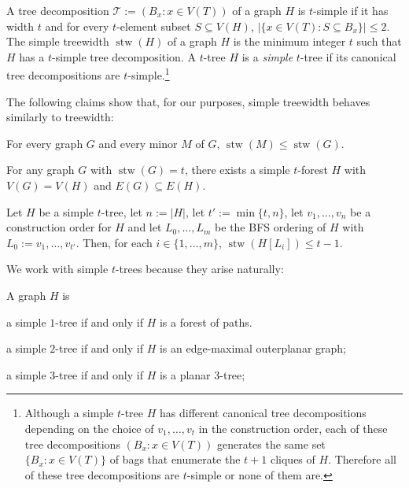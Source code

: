 \documentclass[kpfonts]{patmorin}
\DeclareMathOperator{\stw}{stw}
\theoremstyle{named}
\begin{document}
A tree decomposition $\mathcal{T}:=(B_x:x\in V(T))$ of a graph $H$ is $t$-simple if it has width $t$ and for every $t$-element subset $S\subseteq V(H)$, $|\{x\in V(T):S\subseteq B_x\}|\le 2$.  The simple treewidth $\stw(H)$ of a graph $H$ is the minimum integer $t$ such that $H$ has a $t$-simple tree decomposition.  A $t$-tree $H$ is a \emph{simple} $t$-tree if its canonical tree decompositions are $t$-simple.\footnote{Although a simple $t$-tree $H$ has different canonical tree decompositions depending on the choice of $v_1,\ldots,v_t$ in the construction order, each of these tree decompositions $(B_x:x\in V(T))$ generates the same set $\{B_x:x\in V(T)\}$ of bags that enumerate the $t+1$ cliques of $H$.  Therefore all of these tree decompositions are $t$-simple or none of them are.}

The following claims show that, for our purposes, simple treewidth behaves similarly to treewidth:

\begin{clm}\label{simple-minor-closed}
    For every graph $G$ and every minor $M$ of $G$, $\stw(M)\le\stw(G)$.
\end{clm}

\begin{clm}\label{simple-subgraph}
    For any graph $G$ with $\stw(G)=t$, there exists a simple $t$-forest $H$ with $V(G)= V(H)$ and $E(G)\subseteq E(H)$.
\end{clm}

%

\begin{clm}\label{simple-bfs-layers}
    Let $H$ be a simple $t$-tree, let $n:=|H|$, let $t':=\min\{t,n\}$, let $v_1,\ldots,v_n$ be a construction order for $H$ and let $L_0,\ldots,L_m$ be the BFS ordering of $H$ with $L_0:=v_1,\ldots,v_{t'}$.   Then, for each $i\in\{1,\ldots,m\}$, $\stw(H[L_i])\le t-1$.
\end{clm}

We work with simple $t$-trees because they arise naturally:

\begin{clm}\label{simple-small-cases}
    A graph $H$ is
    \begin{compactenum}[(i)]
        \item a simple $1$-tree if and only if $H$ is a forest of paths.
        \item a simple $2$-tree if and only if $H$ is an edge-maximal outerplanar graph;
        \item a simple $3$-tree if and only if $H$ is a planar 3-tree;
    \end{compactenum}
\end{clm}
\end{document}
